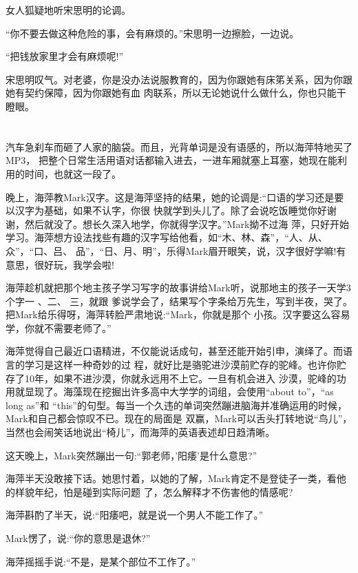 \documentclass[11pt,a4paper,onecolumn]{article}
\begin{document}
女人狐疑地听宋思明的论调。

``你不要去做这种危险的事，会有麻烦的。''宋思明一边擦脸，一边说。

``把钱放家里才会有麻烦呢!''

宋思明叹气。对老婆，你是没办法说服教育的，因为你跟她有床笫关系，因为你跟她有契约保障，因为你跟她有血
肉联系，所以无论她说什么做什么，你也只能干瞪眼。

\section[\thesection]{}汽车急刹车而砸了人家的脑袋。而且，光背单词是没有语感的，所以海萍特地买了MP3，
把整个日常生活用语对话都输入进去，一进车厢就塞上耳塞，她现在能利用的时间，也就这一段了。

晚上，海萍教Mark汉字。这是海萍坚持的结果，她的论调是:``口语的学习还是要以汉字为基础，如果不认字，你很
快就学到头儿了。除了会说吃饭睡觉你好谢谢，然后就没了。想长久深入地学，你就得学汉字。''Mark拗不过海
萍，只好开始学习。海萍想方设法找些有趣的汉字写给他看，如``木、林、森''，``人、从、众''，``口、吕、
品''，``日、月、明''，乐得Mark眉开眼笑，说，汉字很好学嘛!有意思，很好玩，我学会啦!

海萍趁机就把那个地主孩子学习写字的故事讲给Mark听，说那地主的孩子一天学3个字\myrule 一 、二、 三，就跟
爹说学会了，结果写个字条给万先生，写到半夜，哭了。把Mark给乐得呀，海萍转脸严肃地说:``Mark，你就是那个
小孩。汉字要这么容易学，你就不需要老师了。''

海萍觉得自己最近口语精进，不仅能说话成句，甚至还能开始引申，演绎了。而语言的学习是这样一种奇妙的过
程，就好比是骆驼进沙漠前贮存的驼峰。也许你贮存了10年，如果不进沙漠，你就永远用不上它。一旦有机会进入
沙漠，驼峰的功用就显现了。海藻现在挖掘出许多高中大学学的词组，会使用``about to''，``as long as''和
``this''的句型。每当一个久违的单词突然蹦进脑海并准确运用的时候，Mark和自己都会惊叹不已。现在的局面是
双赢，Mark可以舌头打转地说``鸟儿''，当然也会闹笑话地说出``椅儿''，而海萍的英语表述却日趋清晰。

这天晚上，Mark突然蹦出一句:``郭老师，'阳痿'是什么意思?''

海萍半天没敢接下话。她思忖着，以她的了解，Mark肯定不是登徒子一类，看他的样貌年纪，怕是碰到实际问题
了，怎么解释才不伤害他的情感呢?

海萍斟酌了半天，说:``阳痿吧，就是说一个男人不能工作了。''

Mark愣了，说:``你的意思是退休?''

海萍摇摇手说:``不是，是某个部位不工作了。''
\end{document}
